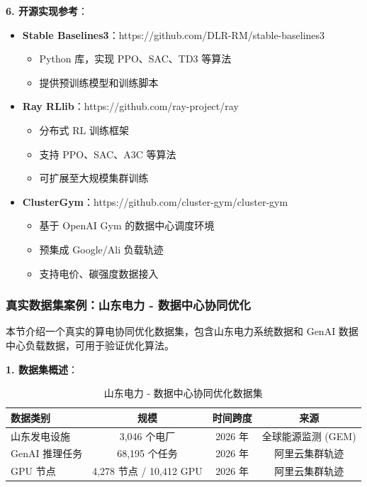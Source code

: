 \documentclass[12pt,a4paper]{article}
\begin{document}
\textbf{6. 开源实现参考}：

\begin{itemize}
    \item \textbf{Stable Baselines3}：https://github.com/DLR-RM/stable-baselines3
    \begin{itemize}
        \item Python 库，实现 PPO、SAC、TD3 等算法
        \item 提供预训练模型和训练脚本
    \end{itemize}
    
    \item \textbf{Ray RLlib}：https://github.com/ray-project/ray
    \begin{itemize}
        \item 分布式 RL 训练框架
        \item 支持 PPO、SAC、A3C 等算法
        \item 可扩展至大规模集群训练
    \end{itemize}
    
    \item \textbf{ClusterGym}：https://github.com/cluster-gym/cluster-gym
    \begin{itemize}
        \item 基于 OpenAI Gym 的数据中心调度环境
        \item 预集成 Google/Ali 负载轨迹
        \item 支持电价、碳强度数据接入
    \end{itemize}
\end{itemize}

\subsubsection{真实数据集案例：山东电力 - 数据中心协同优化}

本节介绍一个真实的算电协同优化数据集，包含山东电力系统数据和 GenAI 数据中心负载数据，可用于验证优化算法。

\textbf{1. 数据集概述}：

\begin{table}[h]
\centering
\caption{山东电力 - 数据中心协同优化数据集}
\label{tab:shandong-dataset}
\begin{tabular}{@{}lccc@{}}
\toprule
\textbf{数据类别} & \textbf{规模} & \textbf{时间跨度} & \textbf{来源} \\
\midrule
山东发电设施 & 3,046 个电厂 & 2026 年 & 全球能源监测 (GEM) \\
GenAI 推理任务 & 68,195 个任务 & 2026 年 & 阿里云集群轨迹 \\
GPU 节点 & 4,278 节点 / 10,412 GPU & 2026 年 & 阿里云集群轨迹 \\
\bottomrule
\end{tabular}
\end{table}
\end{document}
